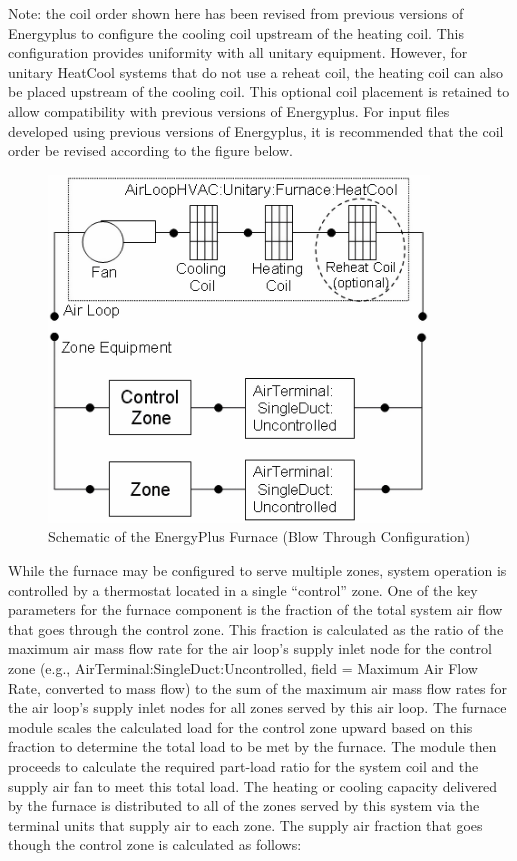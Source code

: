 Note: the coil order shown here has been revised from previous versions of Energyplus to configure the cooling coil upstream of the heating coil. This configuration provides uniformity with all unitary equipment. However, for unitary HeatCool systems that do not use a reheat coil, the heating coil can also be placed upstream of the cooling coil. This optional coil placement is retained to allow compatibility with previous versions of Energyplus. For input files developed using previous versions of Energyplus, it is recommended that the coil order be revised according to the figure below.

\begin{figure}[hbtp] %
\centering
\includegraphics[width=0.9\textwidth, height=0.9\textheight, keepaspectratio=true]{media/image5019.png}
\caption{Schematic of the EnergyPlus Furnace (Blow Through Configuration) \protect \label{fig:schematic-of-the-energyplus-furnace-blow}}
\end{figure}

While the furnace may be configured to serve multiple zones, system operation is controlled by a thermostat located in a single ``control'' zone. One of the key parameters for the furnace component is the fraction of the total system air flow that goes through the control zone. This fraction is calculated as the ratio of the maximum air mass flow rate for the air loop's supply inlet node for the control zone (e.g., AirTerminal:SingleDuct:Uncontrolled, field = Maximum Air Flow Rate, converted to mass flow) to the sum of the maximum air mass flow rates for the air loop's supply inlet nodes for all zones served by this air loop. The furnace module scales the calculated load for the control zone upward based on this fraction to determine the total load to be met by the furnace. The module then proceeds to calculate the required part-load ratio for the system coil and the supply air fan to meet this total load. The heating or cooling capacity delivered by the furnace is distributed to all of the zones served by this system via the terminal units that supply air to each zone. The supply air fraction that goes though the control zone is calculated as follows:

